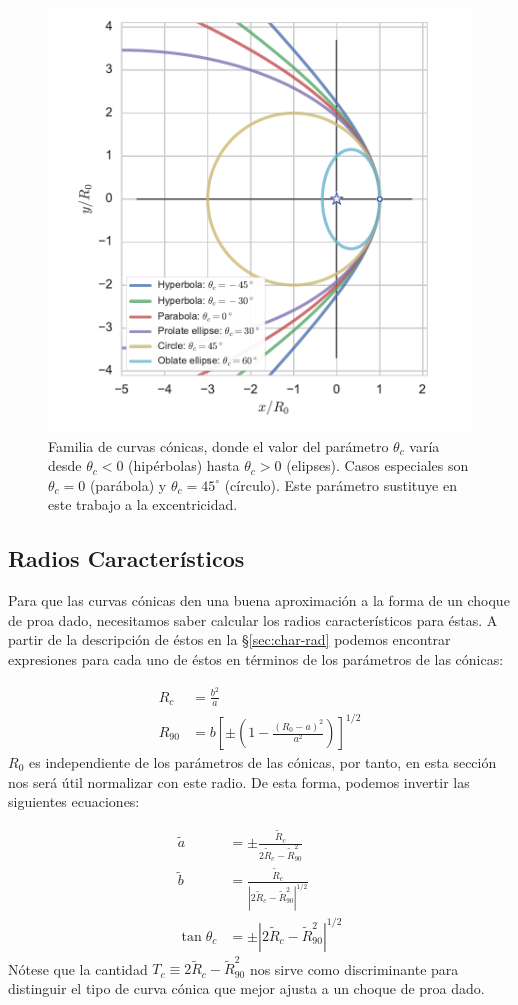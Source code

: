\begin{figure}
  \includegraphics[width = 0.5\linewidth]{./Figures/conic1}
  \caption{Familia de curvas cónicas, donde el valor del parámetro $\theta_c$ varía desde $\theta_c <0$ (hipérbolas) hasta $\theta_c > 0$ (elipses). Casos especiales son $\theta_c = 0$ (parábola) y $\theta_c = 45^\circ$ (círculo). Este parámetro sustituye en este trabajo a la excentricidad.}
  \label{fig:conics-family}
\end{figure}

\subsection{Radios Característicos}
\label{sec:conic-char-radii}
Para que las curvas cónicas den una buena aproximación a la forma de un choque de proa dado, necesitamos saber calcular los radios característicos para éstas. A partir de la descripción de éstos en la \S \ref{sec:char-rad} podemos encontrar expresiones para cada uno de éstos en términos de los parámetros de las cónicas:

\begin{align}
  R_c &= \frac{b^2}{a} \label{eq:R-curv-conic}\\
  R_{90} &= b\left[\pm\left(1 - \frac{(R_0 - a)^2}{a^2}\right)\right]^{1/2} \label{eq:R90-conic}
\end{align}
$R_0$ es independiente de los parámetros de las cónicas, por tanto, en
esta sección nos será útil normalizar con este radio. De esta forma,
podemos invertir las siguientes ecuaciones:

\begin{align}
  \tilde{a} &= \pm\frac{\tilde{R}_c}{2\tilde{R}_c - \tilde{R}_{90}^2} \label{eq:til-a}\\
  \tilde{b} &= \frac{\tilde{R}_c}{\left|2\tilde{R}_c - \tilde{R}_{90}^2\right|^{1/2}}\label{eq:til-b}\\
  \tan\theta_c &= \pm\left|2\tilde{R}_c - \tilde{R}_{90}^2\right|^{1/2} \label{eq:thc2}
\end{align}
Nótese que la cantidad $T_c\equiv 2\tilde{R}_c - \tilde{R}_{90}^2$ nos sirve como discriminante para distinguir el tipo de curva cónica que mejor ajusta a un choque de proa dado.

